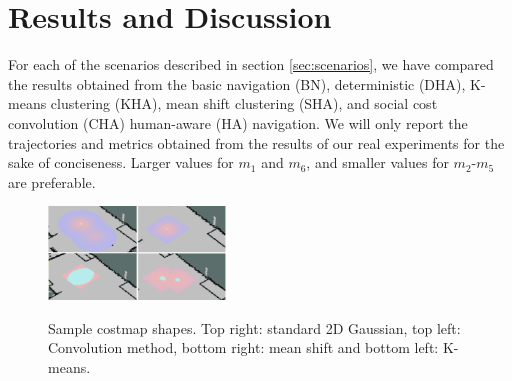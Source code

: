 \section{Results and Discussion}
\label{res}

For each of the scenarios described in section \ref{sec:scenarios}, we have compared the results obtained from the basic navigation (BN), deterministic (DHA), K-means clustering (KHA), mean shift clustering (SHA), and social cost convolution (CHA) human-aware (HA) navigation. We will only report the trajectories and metrics obtained from the results of our real experiments for the sake of conciseness. Larger values for $m_{1}$ and $m_{6}$, and smaller values for $m_{2}$-$m_{5}$ are preferable.


\begin{figure}
\centering
{\includegraphics[width=0.42\textwidth]{pictures/all.eps}\label{fig:costmapPic}}%

\caption{Sample costmap shapes. Top right: standard 2D Gaussian, top left: Convolution method, bottom right: mean shift and bottom left: K-means.}
\label{fig:costmapPic}
\end{figure}


